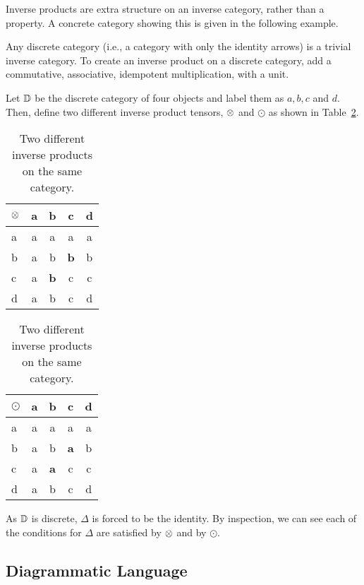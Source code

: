 Inverse products are extra structure on an inverse category, rather than a property. A concrete
category showing this is given in the following example.

\begin{example}
  \label{example:invprodisstructure}
\end{example}
Any discrete category (i.e., a category with only the identity arrows) is a trivial inverse
category. To create an inverse product on a discrete category, add a commutative, associative,
idempotent multiplication, with a unit.

Let $\mathbb{D}$ be the discrete category of four objects and label them as $a,b,c$ and $d$. Then, define
two different inverse product tensors, $\otimes$ and $\odot$ as shown in
Table~\ref{tab:two_different_inverse_products}.

\begin{table}[h!]
  \begin{center}
  \begin{tabular}{|l||c|c|c|c|}
    \hline
    $\otimes$&a&b&c&d\\ \hline \hline
    a&a&a&a&a\\ \hline
    b&a&b&\textbf{b}&b\\ \hline
    c&a&\textbf{b}&c&c \\ \hline
    d&a&b&c&d \\ \hline
  \end{tabular}
  \qquad
  \begin{tabular}{|l||c|c|c|c|} \hline
    $\odot$&a&b&c&d\\ \hline \hline
    a&a&a&a&a\\ \hline
    b&a&b&\textbf{a}&b\\ \hline
    c&a&\textbf{a}&c&c \\ \hline
    d&a&b&c&d \\ \hline
  \end{tabular}
  \end{center}
  \caption{Two different inverse products on the same category.}
  \label{tab:two_different_inverse_products}
\end{table}

As $\mathbb{D}$ is discrete, $\Delta$ is forced to be the identity. By inspection, we can see each of
the conditions for $\Delta$ are satisfied by $\otimes$ and by $\odot$.

\subsection{Diagrammatic Language} %
\label{sub:diagrammatic_language}


